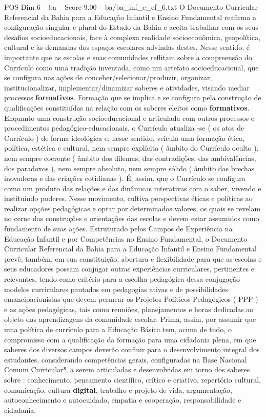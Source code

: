 \begin{textsample}{POS Dim 6 – ba – Score 9.00 – ba/ba\_inf\_e\_ef\_6.txt}  \label{ex:f6_pos_074}
O Documento Curricular Referencial da Bahia para a Educação Infantil e Ensino Fundamental reafirma a configuração singular e plural do Estado da Bahia e aceita trabalhar com os seus desafios socioeducacionais, face à complexa realidade socioeconômica, geopolítica, cultural e às demandas dos espaços escolares advindas destes.
Nesse sentido, é importante que as escolas e suas comunidades reflitam sobre a compreensão do Currículo como uma tradição inventada, como um artefato socioeducacional, que se configura nas ações de conceber/selecionar/produzir, organizar, institucionalizar, implementar/dinamizar saberes e atividades, visando mediar processos \textbf{formativos}.
Formação que se implica e se configura pela construção de qualificações constituídas na relação com os saberes eleitos como \textbf{formativos}.
Enquanto uma construção socioeducacional e articulada com outros processos e procedimentos pedagógico-educacionais, o Currículo atualiza -se ( os atos de Currículo ) de forma ideológica e, nesse sentido, veicula uma formação ética, política, estética e cultural, nem sempre explícita ( âmbito do Currículo oculto ), nem sempre coerente ( âmbito dos dilemas, das contradições, das ambivalências, dos paradoxos ), nem sempre absoluto, nem sempre sólido ( âmbito das brechas inovadoras e das criações cotidianas ).
É, assim, que o Currículo se configura como um produto das relações e das dinâmicas interativas com o saber, vivendo e instituindo poderes.
Nesse movimento, cultiva perspectivas éticas e políticas ao realizar opções pedagógicas e optar por determinados valores, os quais se revelam no cerne das construções e orientações das escolas e devem estar assumidos como fundamento de suas ações.
Estruturado pelos Campos de Experiência na Educação Infantil e por Competências no Ensino Fundamental, o Documento Curricular Referencial da Bahia para a Educação Infantil e Ensino Fundamental prevê, também, em sua constituição, abertura e flexibilidade para que as escolas e seus educadores possam conjugar outras experiências curriculares, pertinentes e relevantes, tendo como critério para a escolha pedagógica dessa conjugação modelos curriculares pautados em pedagogias ativas e de possibilidades emancipacionistas que devem permear os Projetos Políticos-Pedagógicos ( PPP ) e as ações pedagógicas, tais como reuniões, planejamentos e horas dedicadas ao objeto das aprendizagens da comunidade escolar.
Prima, assim, por assumir que uma política de currículo para a Educação Básica tem, acima de tudo, o compromisso com a qualificação da formação para uma cidadania plena, em que saberes dos diversos campos deverão confluir para o desenvolvimento integral dos estudantes, considerando competências gerais, configuradas na Base Nacional Comum Curricular⁸, a serem articuladas e desenvolvidas em torno dos saberes sobre : conhecimento, pensamento científico, crítico e criativo, repertório cultural, comunicação, cultura \textbf{digital}, trabalho e projeto de vida, argumentação, autoconhecimento e autocuidado, empatia e cooperação, responsabilidade e cidadania.

\end{textsample}
